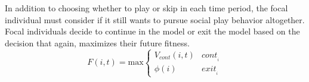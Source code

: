 \documentclass[12pt, letterpaper, fleqn]{article}
\begin{document}
      In addition to choosing whether to play or skip in each time period, the focal individual must consider if it still wants to pursue social play behavior altogether. %
      Focal individuals decide to continue in the model or exit the model based on the decision that again, maximizes their future fitness.
      \begin{equation}
      F(i,t)=\text{max}
      \begin{cases}
      V_{cont}(i,t)                                                                   & cont_{_i} \\
      \phi(i)                                                                         & exit_{_i}
      \end{cases}
      \label{breif}
      \end{equation}
      
          
\end{document}
